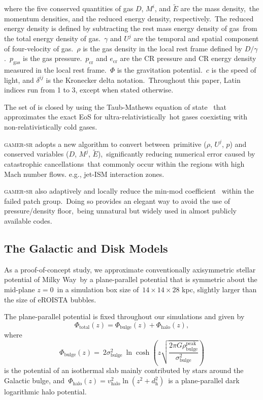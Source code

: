 \documentclass[twocolumn]{aastex631}
\begin{document}
  where the five conserved quantities of gas $D$, $M^{i}$, and $\tilde{E}$ are the mass density,\
  the momentum densities, and the reduced energy density, respectively.\
  The reduced energy density is defined by subtracting the rest mass energy density of gas\
  from the total energy density of gas.\
  $\gamma$ and $U^{j}$ are the temporal and spatial component of four-velocity of gas.\
  $\rho$ is the gas density in the local rest frame defined by $D/\gamma$.\
  $p_{\text{gas}}$ is the gas pressure.\
  $p_{\text{cr}}$ and $e_{\text{cr}}$ are the CR pressure and CR energy density measured in the local rest frame.\
  $\Phi$ is the gravitation potential.\
  $c$ is the speed of light, and $\delta^{ij}$ is the Kronecker delta notation.\
  Throughout this paper, Latin indices run from 1 to 3, except when stated otherwise.\

  The set of \Cref{governing-eq} is closed by using the Taub-Mathews equation of state \citep{Taub,TM_EOS}\
  that approximates the exact EoS \citep{Synge} for ultra-relativistically\
  hot gases coexisting with non-relativistically cold gases.

  \textsc{gamer-sr} adopts a new algorithm \citep{tseng2021} to convert between\
  primitive ($\rho$, $U^{j}$, $p$) and conserved variables ($D$, $M^{j}$, $\tilde{E}$),\
  significantly reducing numerical error caused by catastrophic cancellations\
  that commonly occur within the regions with high Mach number flows. e.g., jet-ISM interaction zones.

  \textsc{gamer-sr} also adaptively and locally reduce the min-mod coefficient\
  \citep{tseng2021} within the failed patch group.\
  Doing so provides an elegant way to avoid the use of pressure/density floor,\
  being unnatural but widely used in almost publicly available codes.\

  \subsection{The Galactic and Disk Models}
  As a proof-of-concept study, we approximate conventionally axisymmetric stellar potential of Milky Way\
  by a plane-parallel potential that is symmetric about the mid-plane $z=0$\
  in a simulation box size of\
  $14\times14\times28$ kpc, slightly larger than the size of eROISTA bubbles.

  The plane-parallel potential is fixed throughout our simulations and given by
  \begin{equation}
    \Phi_{\text{total}}(z) = \Phi_{\text{bulge}}(z) + \Phi_{\text{halo}}(z),
  \end{equation}
  where
  \begin{equation}
    \Phi_{\text{bulge}}(z)=\
    2\sigma^2_{\text{bulge}}\
    \ln\cosh\left(z\sqrt{\frac{2\pi G\rho_{\text{bulge}}^{\text{peak}}}{\sigma^2_{\text{bulge}}}}\right)
  \end{equation}
  is the potential of an isothermal slab mainly contributed by stars around the Galactic bulge, and\
  $\Phi_{\text{halo}}(z)=v^2_{\text{halo}}\ln\left(z^2+d^2_{\text{h}}\right)$\
  is a plane-parallel dark logarithmic halo potential.
\end{document}
